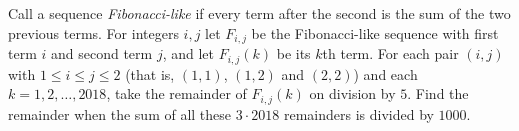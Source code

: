 Call a sequence \emph{Fibonacci-like} if every term after the second is the sum of the two previous terms. For integers $i,j$ let $F_{i,j}$ be the Fibonacci-like sequence with first term $i$ and second term $j$, and let $F_{i,j}(k)$ be its $k$th term. For each pair $(i,j)$ with $1\le i\le j\le2$ (that is, $(1,1)$, $(1,2)$ and $(2,2)$) and each $k=1,2,\dots,2018$, take the remainder of $F_{i,j}(k)$ on division by $5$. Find the remainder when the sum of all these $3\cdot2018$ remainders is divided by $1000$.
